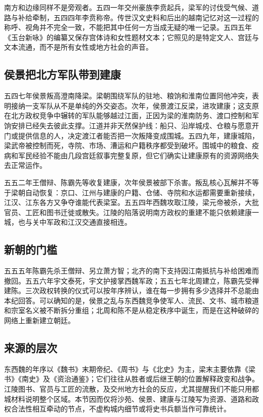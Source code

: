 南方和边缘同样不是旁观者。五四一年交州豪族李贲起兵，梁军的讨伐受气候、道路与补给牵制，五四四年李贲称帝。传世汉文史料和后出的越南记忆对这一过程的称呼、视角并不完全一致，不能把其中任何一方当成无疑的唯一记录。五四五年《玉台新咏》的编纂又保存宫体诗和女性题材文本；它照见的是特定文人、宫廷与文本流通，而不是所有女性或地方社会的声音。

\subsection{侯景把北方军队带到建康}

五四七年侯景叛高澄南降梁。梁朝围绕军队的驻地、粮饷和淮南位置同他冲突，表明接纳一支军队从不是单纯的外交姿态。次年，\hypertarget{evt:NSL-440-589-191}{\textcolor{dynasty}{侯景渡江反梁，进攻建康}}；这支原在北方政权竞争中辗转的军队能够越过江面，正因为梁的淮南防务、渡口控制和军饷安排已经失去彼此支撑。江道并非天然保护线：船只、沿岸城戍、仓粮与愿意开门或提供信息的人，决定渡江者能否把一次叛降变成围城。五四九年，\hypertarget{evt:NSL-440-589-195}{\textcolor{dynasty}{建康城陷}}，梁武帝被控制而死，寺院、市场、漕运和户籍秩序都受到破坏。围城中的粮食、疫病和军民经验不能由几段宫廷叙事完整复原，但它们确实让建康原有的资源网络失去正常运作。

五五二年王僧辩、陈霸先等收复建康，次年侯景被部下杀害。叛乱核心瓦解并不等于梁朝自动恢复：京口、江州与建康的户籍、仓储、寺院和水运都需要重新接续，江汉、江东各方又争夺谁能代表梁室。五五四年西魏攻取江陵，梁元帝被杀，大批官员、工匠和图书迁徙或散失。江陵的陷落说明南方政权的重建不能只依赖建康一城，也与关中军政和江汉交通直接相连。

\subsection{新朝的门槛}

五五五年陈霸先杀王僧辩、另立萧方智；北齐的南下支持因江南抵抗与补给困难而撤回。五五六年宇文泰死，宇文护接掌西魏军政；五五七年北周建立，陈霸先受禅建陈。三次政权转换的仪式可以按年序辨认，谁在每一步拥有多少选择并不总能由本纪回答。可以确知的是，侯景之乱与东西魏竞争使军人、流民、文书、城市粮道和宗室名义被不断拆分重组；北周和陈不是从稳定秩序中诞生，而是在这种破碎的网络上重新建立朝廷。

\subsection{来源的层次}

东西魏的年序以《魏书》末期帝纪、《周书》与《北史》为主，梁末主要依靠《梁书》《南史》及《资治通鉴》；它们往往从胜者或后继王朝的位置解释政变和战争。江陵图书、官员与工匠的流散，及交州地方社会的反应，尤其提醒我们不能只用都城材料说明整个区域。本节因而仅将沙苑、侯景、建康与江陵写为资源、道路和政权合法性相互牵动的节点，不虚构城内细节或将史书兵额当作可靠统计。

